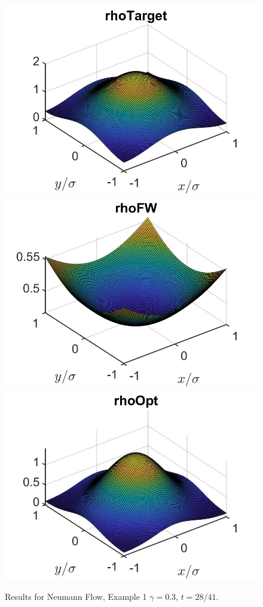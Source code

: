 \documentclass[11pt, a4paper]{article}
\theoremstyle{definition}
\begin{document}
\begin{figure}[h]
	\includegraphics[scale=0.3]{rhoHat2DN1a.jpg}
	\includegraphics[scale=0.3]{rhoFW2DN1a.jpg}
	\includegraphics[scale=0.3]{rhoOpt2DN1a.jpg}
	\caption{Results for Neumann Flow, Example 1 $\gamma = 0.3$, $t = 28/41$.}
	\label{Ex12DN1a}
\end{figure}
\end{document}
